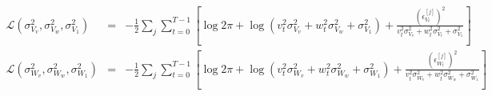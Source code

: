\documentclass[12pt]{dalcsthesis}
\begin{document}
\begin{eqnarray}
\mathcal{{L}}(\sigma_{V_{v}}^{2},\sigma_{V_{w}}^{2},\sigma_{V_{1}}^{2})&=&-\frac{1}{2}\sum_{j}\sum_{t=0}^{T-1}[\log2\pi+\log(v_{t}^{2}\sigma_{V_{v}}^{2}+w_{t}^{2}\sigma_{V_{w}}^{2}+\sigma_{V_{1}}^{2})+\frac{(\epsilon_{V_{t}}^{[j]})^{2}}{v_{t}^{2}\sigma_{V_{v}}^{2}+w_{t}^{2}\sigma_{V_{r}}^{2}+\sigma_{V_{1}}^{2}}]\\
\mathcal{{L}}(\sigma_{W_{v}}^{2},\sigma_{W_{w}}^{2},\sigma_{W_{1}}^{2})&=&-\frac{1}{2}\sum_{j}\sum_{t=0}^{T-1}[\log2\pi+\log(v_{t}^{2}\sigma_{W_{v}}^{2}+w_{t}^{2}\sigma_{W_{w}}^{2}+\sigma_{W_{1}}^{2})+\frac{(\epsilon_{W_{t}}^{[j]})^{2}}{v_{t}^{2}\sigma_{W_{v}}^{2}+w_{t}^{2}\sigma_{W_{w}}^{2}+\sigma_{W_{1}}^{2}}]
\end{eqnarray}
 
\end{document}
